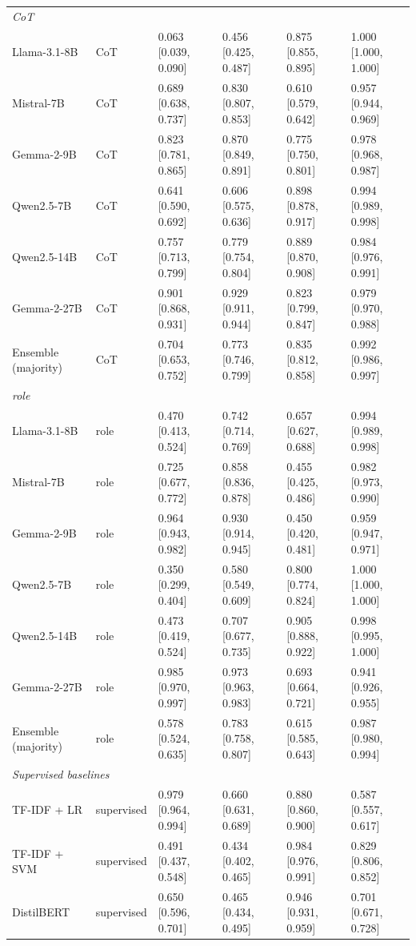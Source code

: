 \begin{tabular}{llllll}
\midrule
\multicolumn{6}{l}{\textit{CoT}} \\
Llama-3.1-8B & CoT & 0.063 [0.039, 0.090] & 0.456 [0.425, 0.487] & 0.875 [0.855, 0.895] & 1.000 [1.000, 1.000] \\
Mistral-7B & CoT & 0.689 [0.638, 0.737] & 0.830 [0.807, 0.853] & 0.610 [0.579, 0.642] & 0.957 [0.944, 0.969] \\
Gemma-2-9B & CoT & 0.823 [0.781, 0.865] & 0.870 [0.849, 0.891] & 0.775 [0.750, 0.801] & 0.978 [0.968, 0.987] \\
Qwen2.5-7B & CoT & 0.641 [0.590, 0.692] & 0.606 [0.575, 0.636] & 0.898 [0.878, 0.917] & 0.994 [0.989, 0.998] \\
Qwen2.5-14B & CoT & 0.757 [0.713, 0.799] & 0.779 [0.754, 0.804] & 0.889 [0.870, 0.908] & 0.984 [0.976, 0.991] \\
Gemma-2-27B & CoT & 0.901 [0.868, 0.931] & 0.929 [0.911, 0.944] & 0.823 [0.799, 0.847] & 0.979 [0.970, 0.988] \\
Ensemble (majority) & CoT & 0.704 [0.653, 0.752] & 0.773 [0.746, 0.799] & 0.835 [0.812, 0.858] & 0.992 [0.986, 0.997] \\
\midrule
\multicolumn{6}{l}{\textit{role}} \\
Llama-3.1-8B & role & 0.470 [0.413, 0.524] & 0.742 [0.714, 0.769] & 0.657 [0.627, 0.688] & 0.994 [0.989, 0.998] \\
Mistral-7B & role & 0.725 [0.677, 0.772] & 0.858 [0.836, 0.878] & 0.455 [0.425, 0.486] & 0.982 [0.973, 0.990] \\
Gemma-2-9B & role & 0.964 [0.943, 0.982] & 0.930 [0.914, 0.945] & 0.450 [0.420, 0.481] & 0.959 [0.947, 0.971] \\
Qwen2.5-7B & role & 0.350 [0.299, 0.404] & 0.580 [0.549, 0.609] & 0.800 [0.774, 0.824] & 1.000 [1.000, 1.000] \\
Qwen2.5-14B & role & 0.473 [0.419, 0.524] & 0.707 [0.677, 0.735] & 0.905 [0.888, 0.922] & 0.998 [0.995, 1.000] \\
Gemma-2-27B & role & 0.985 [0.970, 0.997] & 0.973 [0.963, 0.983] & 0.693 [0.664, 0.721] & 0.941 [0.926, 0.955] \\
Ensemble (majority) & role & 0.578 [0.524, 0.635] & 0.783 [0.758, 0.807] & 0.615 [0.585, 0.643] & 0.987 [0.980, 0.994] \\
\midrule
\multicolumn{6}{l}{\textit{Supervised baselines}} \\
TF-IDF + LR & supervised & 0.979 [0.964, 0.994] & 0.660 [0.631, 0.689] & 0.880 [0.860, 0.900] & 0.587 [0.557, 0.617] \\
TF-IDF + SVM & supervised & 0.491 [0.437, 0.548] & 0.434 [0.402, 0.465] & 0.984 [0.976, 0.991] & 0.829 [0.806, 0.852] \\
DistilBERT & supervised & 0.650 [0.596, 0.701] & 0.465 [0.434, 0.495] & 0.946 [0.931, 0.959] & 0.701 [0.671, 0.728] \\
\bottomrule
\end{tabular}

